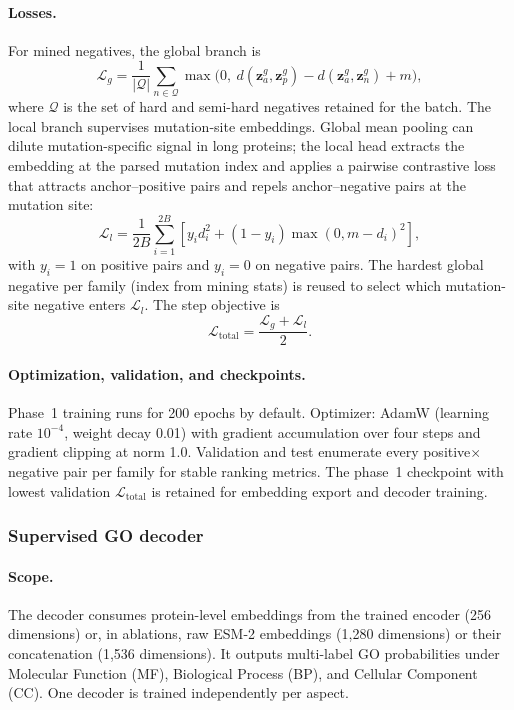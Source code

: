 \documentclass[11pt,a4paper]{article}
\begin{document}
\paragraph{Losses.}
For mined negatives, the global branch is
\[
\mathcal{L}_{g}=\frac{1}{|\mathcal{Q}|}\sum_{n\in\mathcal{Q}}\max\bigl(0,\ d(\mathbf{z}_a^g,\mathbf{z}_p^g)-d(\mathbf{z}_a^g,\mathbf{z}_n^g)+m\bigr),
\]
where $\mathcal{Q}$ is the set of hard and semi-hard negatives retained for the batch. The local branch supervises mutation-site embeddings. Global mean pooling can dilute mutation-specific signal in long proteins; the local head extracts the embedding at the parsed mutation index and applies a pairwise contrastive loss that attracts anchor--positive pairs and repels anchor--negative pairs at the mutation site:
\[
\mathcal{L}_{l}=\frac{1}{2B}\sum_{i=1}^{2B}\left[y_i d_i^2 + (1-y_i)\max(0,m-d_i)^2\right],
\]
with $y_i=1$ on positive pairs and $y_i=0$ on negative pairs. The hardest global negative per family (index from mining stats) is reused to select which mutation-site negative enters $\mathcal{L}_l$. The step objective is
\[
\mathcal{L}_{\text{total}}=\frac{\mathcal{L}_{g}+\mathcal{L}_{l}}{2}.
\]

\paragraph{Optimization, validation, and checkpoints.}
Phase~1 training runs for 200 epochs by default. Optimizer: AdamW (learning rate $10^{-4}$, weight decay 0.01) with gradient accumulation over four steps and gradient clipping at norm 1.0. Validation and test enumerate every positive$\times$negative pair per family for stable ranking metrics. The phase~1 checkpoint with lowest validation $\mathcal{L}_{\text{total}}$ is retained for embedding export and decoder training.

\subsubsection{Supervised GO decoder}
\label{sec:decoder}

\paragraph{Scope.}
The decoder consumes protein-level embeddings from the trained encoder (256 dimensions) or, in ablations, raw ESM-2 embeddings (1{,}280 dimensions) or their concatenation (1{,}536 dimensions). It outputs multi-label GO probabilities under Molecular Function (MF), Biological Process (BP), and Cellular Component (CC). One decoder is trained independently per aspect.
\end{document}
